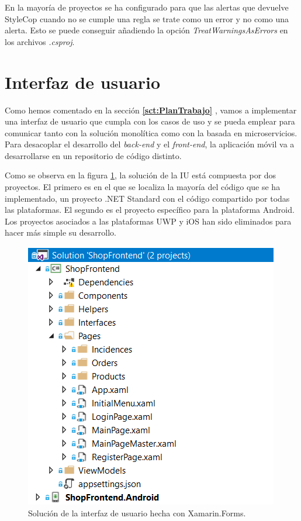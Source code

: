 \documentclass[11pt,spanish,listoffigures]{tfgetsinf}
\begin{document}
En la mayoría de proyectos se ha configurado para que las alertas que devuelve StyleCop cuando no se cumple una regla se trate como un error y no como una alerta. Esto se puede conseguir añadiendo la opción \textit{TreatWarningsAsErrors} en los archivos \textit{.csproj}.

\newpage

\section{Interfaz de usuario}

Como hemos comentado en la sección \textbf{\ref{sct:PlanTrabajo} }, vamos a implementar una interfaz de usuario que cumpla con los casos de uso y se pueda emplear para comunicar tanto con la solución monolítica como con la basada en microservicios. Para desacoplar el desarrollo del \textit{back-end} y el \textit{front-end}, la aplicación móvil va a desarrollarse en un repositorio de código distinto.

Como se observa en la figura \ref{fig:ShopFrontEnd}, la solución de la IU está compuesta por dos proyectos. El primero es en el que se localiza la mayoría del código que se ha implementado, un proyecto .NET Standard con el código compartido por todas las plataformas. El segundo es el proyecto específico para la plataforma Android. Los proyectos asociados a las plataformas UWP y iOS han sido eliminados para hacer más simple su desarrollo.

\begin{figure}[h]
\centering
\includegraphics[scale=0.8]{ShopFrontEnd}
\caption{Solución de la interfaz de usuario hecha con Xamarin.Forms.}
\label{fig:ShopFrontEnd}
\end{figure}
\end{document}
